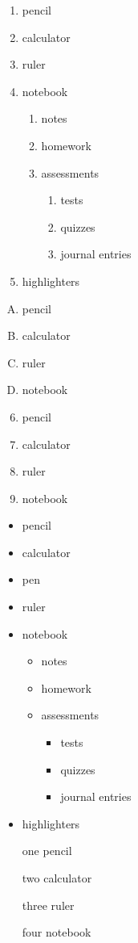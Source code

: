 \documentclass[11pt]{article}
\begin{document}
\begin{enumerate}
\item pencil
\item calculator
\item ruler
\item notebook
	\begin{enumerate}
	\item notes
	\item homework
	\item assessments
		\begin{enumerate}
		\item tests
		\item quizzes
		\item journal entries
		\end{enumerate}
	\end{enumerate}
\item highlighters
\end{enumerate}

\vspace{1cm}

\begin{enumerate}[A.]
\item pencil
\item calculator
\item ruler
\item notebook
\end{enumerate}

\vspace{1cm}

\begin{enumerate} \setcounter{enumi}{5}
\item pencil
\item calculator
\item ruler
\item notebook
\end{enumerate}

\pagebreak

\begin{itemize}
\item pencil
\item calculator
\item pen
\item ruler
\item notebook
	\begin{itemize}
	\item notes
	\item homework
	\item assessments
		\begin{itemize}
		\item tests
		\item quizzes
		\item journal entries
		\end{itemize}
	\end{itemize}
\item highlighters
\end{itemize}

\vspace{1cm}

\begin{enumerate}
\item[one] pencil
\item[two] calculator
\item[three] ruler
\item[four] notebook
\end{enumerate}
\end{document}
